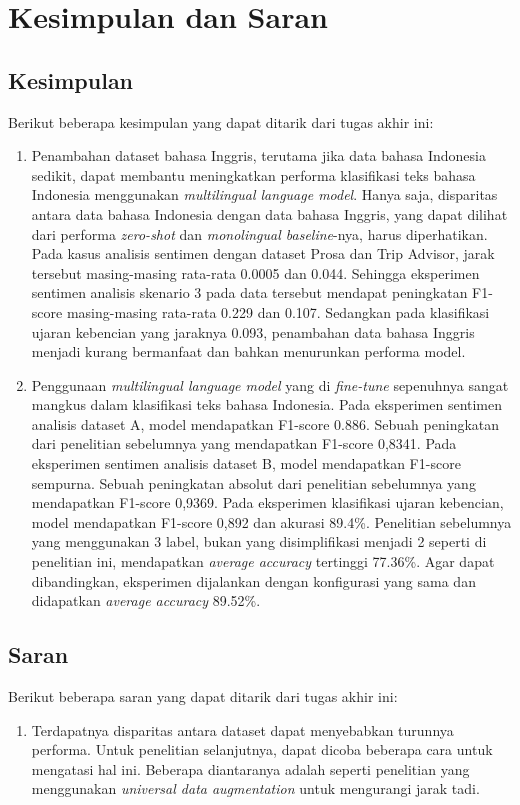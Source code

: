 \chapter{Kesimpulan dan Saran}

\section{Kesimpulan}
Berikut beberapa kesimpulan yang dapat ditarik dari tugas akhir ini:
\begin{enumerate}
    \item Penambahan dataset bahasa Inggris, terutama jika data bahasa Indonesia sedikit, dapat membantu meningkatkan performa klasifikasi teks bahasa Indonesia menggunakan \textit{multilingual language model}. Hanya saja, disparitas antara data bahasa Indonesia dengan data bahasa Inggris, yang dapat dilihat dari performa \textit{zero-shot} dan \textit{monolingual baseline}-nya, harus diperhatikan. Pada kasus analisis sentimen dengan dataset Prosa dan Trip Advisor, jarak tersebut masing-masing rata-rata 0.0005 dan 0.044. Sehingga eksperimen sentimen analisis skenario 3 pada data tersebut mendapat peningkatan F1-score masing-masing rata-rata 0.229 dan 0.107. Sedangkan pada klasifikasi ujaran kebencian yang jaraknya 0.093, penambahan data bahasa Inggris menjadi kurang bermanfaat dan bahkan menurunkan performa model.
    \item Penggunaan \textit{multilingual language model} yang di \textit{fine-tune} sepenuhnya sangat mangkus dalam klasifikasi teks bahasa Indonesia. Pada eksperimen sentimen analisis dataset A, model mendapatkan F1-score 0.886. Sebuah peningkatan dari penelitian sebelumnya yang mendapatkan F1-score 0,8341. Pada eksperimen sentimen analisis dataset B, model mendapatkan F1-score sempurna. Sebuah peningkatan absolut dari penelitian sebelumnya yang mendapatkan F1-score 0,9369. Pada eksperimen klasifikasi ujaran kebencian, model mendapatkan F1-score 0,892 dan akurasi 89.4\%. Penelitian sebelumnya yang menggunakan 3 label, bukan yang disimplifikasi menjadi 2 seperti di penelitian ini, mendapatkan \textit{average accuracy} tertinggi 77.36\%. Agar dapat dibandingkan, eksperimen dijalankan dengan konfigurasi yang sama dan didapatkan \textit{average accuracy} 89.52\%. 

\end{enumerate}

\section{Saran}
Berikut beberapa saran yang dapat ditarik dari tugas akhir ini:
\begin{enumerate}
    \item Terdapatnya disparitas antara dataset dapat menyebabkan turunnya performa. Untuk penelitian selanjutnya, dapat dicoba beberapa cara untuk mengatasi hal ini. Beberapa diantaranya adalah seperti penelitian \parencite{Lai_Oguz_Yang_Stoyanov_2019} yang menggunakan \textit{universal data augmentation} untuk mengurangi jarak tadi.
\end{enumerate}